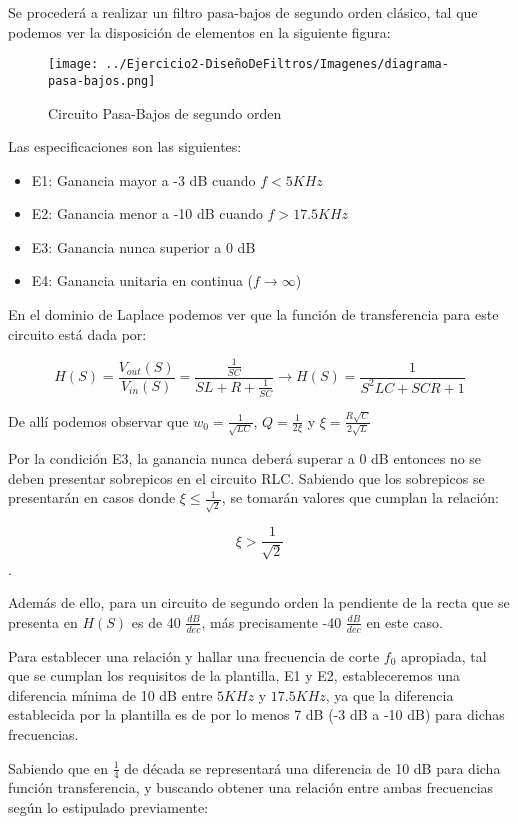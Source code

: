 Se procederá a realizar un filtro pasa-bajos de segundo orden clásico, tal que podemos
ver la disposición de elementos en la siguiente figura:

\begin{figure}[H]
    \centering
    \texttt{[image: ../Ejercicio2-DiseñoDeFiltros/Imagenes/diagrama-pasa-bajos.png]}
    \caption{Circuito Pasa-Bajos de segundo orden}
\end{figure}

Las especificaciones son las siguientes:

\begin{itemize}
	\item E1: Ganancia mayor a -3 dB cuando $f < 5 KHz$ 
	\item E2: Ganancia menor a -10 dB cuando $f > 17.5 KHz $
	\item E3: Ganancia nunca superior a 0 dB
	\item E4: Ganancia unitaria en continua ($f \to \infty$)
\end{itemize}

En el dominio de Laplace podemos ver que la función de transferencia para este circuito está dada por:

$$H(S)=\frac{V_{out}(S)}{V_{in}(S)}=\frac{\frac{1}{SC}}{SL+R+\frac{1}{SC}} \longrightarrow 
H(S)=\frac{1}{S^2LC+SCR+1}$$

De allí podemos observar que $w_0=\frac{1}{\sqrt{LC}}$, $Q=\frac{1}{2\xi}$ y $\xi=\frac{R\sqrt{C}}{2\sqrt{L}}$

Por la condición E3, la ganancia nunca deberá superar a 0 dB entonces no se deben presentar sobrepicos en el circuito RLC.
Sabiendo que los sobrepicos se presentarán en casos donde $\xi \leq \frac{1}{\sqrt{2}}$, se tomarán valores que cumplan la relación:

$$\xi > \frac{1}{\sqrt{2}}$$.

Además de ello, para un circuito de segundo orden la pendiente de la recta que se presenta en $H(S)$ es de 
40 $\frac{dB}{dec}$, más precisamente -40 $\frac{dB}{dec}$ en este caso. 

Para establecer una relación y hallar una frecuencia de corte $f_0$ apropiada, tal que se cumplan los requisitos
de la plantilla, E1 y E2, estableceremos una diferencia mínima de 10 dB entre $5 KHz$ y $17.5 KHz$, ya que la diferencia establecida por la plantilla
es de por lo menos 7 dB (-3 dB a -10 dB) para dichas frecuencias.

Sabiendo que en $\frac{1}{4}$ de década se representará una diferencia de 10 dB para dicha función transferencia, y buscando obtener una
relación entre ambas frecuencias según lo estipulado previamente:

